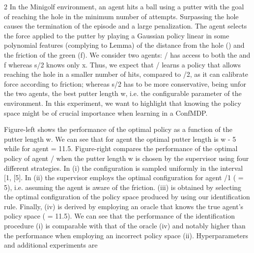 \documentclass{article}
\begin{document}
\begin{paracol}{2}
In the Minigolf environment, an agent hits a ball using a putter with the goal of reaching the hole in the minimum number of attempts. Surpassing the hole causes the termination
of the episode and a large penalization. The agent selects the
force applied to the putter by playing a Gaussian policy linear in some polynomial features (complying to Lemma) of
the distance from the hole () and the friction of the green
(f). We consider two agents: / has access to both the  and
f whereas s/2 knows only x. Thus, we expect that / learns
a policy that allows reaching the hole in a smaller number of
hits, compared to /2, as it can calibrate force according to
friction; whereas s/2 has to be more conservative, being unfor the two agents, the best putter length w, i.e. the configurable parameter of the environment. In this experiment, we
want to highlight that knowing the policy space might be of
crucial importance when learning in a ConfMDP.


Figure-left shows the performance of the optimal policy
as a function of the putter length w. We can see that for agent
 the optimal putter length is w - 5 while for agent
= 11.5. Figure-right compares the performance
of the optimal policy of agent / when the putter length w
is chosen by the supervisor using four different strategies.
In (i) the configuration is sampled uniformly in the interval
[1, [5]. In (ii) the supervisor employs the optimal configuration for agent /1 ( = 5), i.e. assuming the agent is aware
of the friction. (iii) is obtained by selecting the optimal configuration of the policy space produced by using our identification rule. Finally, (iv) is derived by employing an oracle
that knows the true agent's policy space ( = 11.5). We can
see that the performance of the identification procedure (i)
is comparable with that of the oracle (iv) and notably higher
than the performance when employing an incorrect policy
space (ii). Hyperparameters and additional experiments are

\end{paracol}
\end{document}
